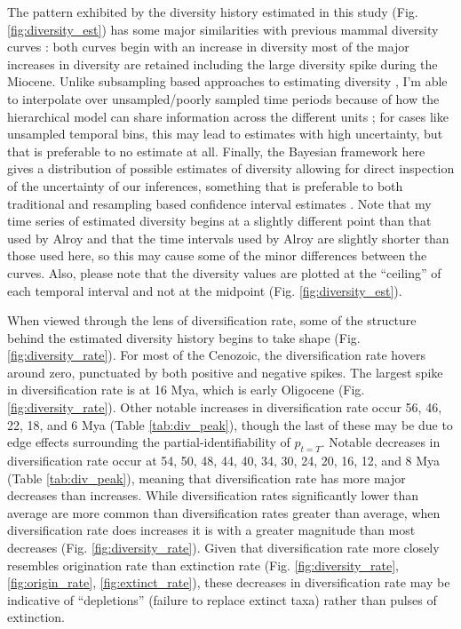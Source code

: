 The pattern exhibited by the diversity history estimated in this study (Fig. \ref{fig:diversity_est}) has some major similarities with previous mammal diversity curves \citep{Alroy2009}: both curves begin with an increase in diversity most of the major increases in diversity are retained including the large diversity spike during the Miocene. Unlike subsampling based approaches to estimating diversity \citep{Alroy2010c}, I'm able to interpolate over unsampled/poorly sampled time periods because of how the hierarchical model can share information across the different units \cite{Gelman2013d}; for cases like unsampled temporal bins, this may lead to estimates with high uncertainty, but that is preferable to no estimate at all. Finally, the Bayesian framework here gives a distribution of possible estimates of diversity allowing for direct inspection of the uncertainty of our inferences, something that is preferable to both traditional and resampling based confidence interval estimates \citep{Gelman2013d}. Note that my time series of estimated diversity begins at a slightly different point than that used by Alroy \citep{Alroy2009} and that the time intervals used by Alroy \citep{Alroy2009} are slightly shorter than those used here, so this may cause some of the minor differences between the curves. Also, please note that the diversity values are plotted at the ``ceiling'' of each temporal interval and not at the midpoint (Fig. \ref{fig:diversity_est}).

When viewed through the lens of diversification rate, some of the structure behind the estimated diversity history begins to take shape (Fig. \ref{fig:diversity_rate}). For most of the Cenozoic, the diversification rate hovers around zero, punctuated by both positive and negative spikes. The largest spike in diversification rate is at 16 Mya, which is early Oligocene (Fig. \ref{fig:diversity_rate}). Other notable increases in diversification rate occur 56, 46, 22, 18, and 6 Mya (Table \ref{tab:div_peak}), though the last of these may be due to edge effects surrounding the partial-identifiability of \(p_{t = T}\). Notable decreases in diversification rate occur at 54, 50, 48, 44, 40, 34, 30, 24, 20, 16, 12, and 8 Mya (Table \ref{tab:div_peak}), meaning that diversification rate has more major decreases than increases. While diversification rates significantly lower than average are more common than diversification rates greater than average, when diversification rate does increases it is with a greater magnitude than most decreases (Fig. \ref{fig:diversity_rate}). Given that diversification rate more closely resembles origination rate than extinction rate (Fig. \ref{fig:diversity_rate}, \ref{fig:origin_rate}, \ref{fig:extinct_rate}), these decreases in diversification rate may be indicative of ``depletions'' (failure to replace extinct taxa) rather than pulses of extinction. 


